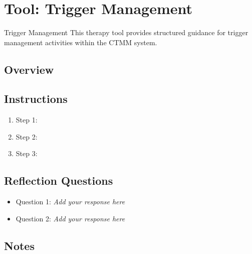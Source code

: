 
\section{Tool: Trigger Management}
\label{sec:tool-trigger-management}

\begin{ctmmBlueBox}{Trigger Management}
This therapy tool provides structured guidance for trigger management activities within the CTMM system.
\end{ctmmBlueBox}

\subsection{Overview}

\subsection{Instructions}

\begin{enumerate}
\item Step 1: \checkbox~
\item Step 2: \checkbox~
\item Step 3: \checkbox~
\end{enumerate}

\subsection{Reflection Questions}

\begin{itemize}
\item Question 1: \textit{Add your response here}
\item Question 2: \textit{Add your response here}
\end{itemize}

\subsection{Notes}

\vspace{2cm}

